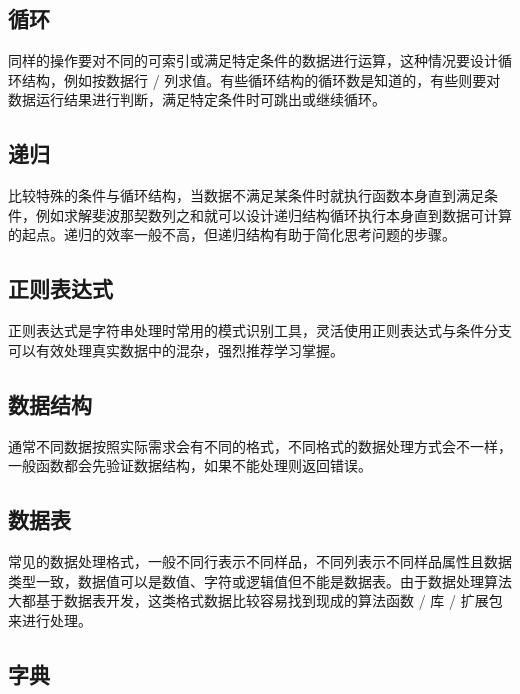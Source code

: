 \documentclass[]{book}
\begin{document}
\hypertarget{ux5faaux73af}{%
\subsection{循环}\label{ux5faaux73af}}

同样的操作要对不同的可索引或满足特定条件的数据进行运算，这种情况要设计循环结构，例如按数据行 / 列求值。有些循环结构的循环数是知道的，有些则要对数据运行结果进行判断，满足特定条件时可跳出或继续循环。

\hypertarget{ux9012ux5f52}{%
\subsection{递归}\label{ux9012ux5f52}}

比较特殊的条件与循环结构，当数据不满足某条件时就执行函数本身直到满足条件，例如求解斐波那契数列之和就可以设计递归结构循环执行本身直到数据可计算的起点。递归的效率一般不高，但递归结构有助于简化思考问题的步骤。

\hypertarget{ux6b63ux5219ux8868ux8fbeux5f0f}{%
\subsection{正则表达式}\label{ux6b63ux5219ux8868ux8fbeux5f0f}}

正则表达式是字符串处理时常用的模式识别工具，灵活使用正则表达式与条件分支可以有效处理真实数据中的混杂，强烈推荐学习掌握。

\hypertarget{ux6570ux636eux7ed3ux6784}{%
\subsection{数据结构}\label{ux6570ux636eux7ed3ux6784}}

通常不同数据按照实际需求会有不同的格式，不同格式的数据处理方式会不一样，一般函数都会先验证数据结构，如果不能处理则返回错误。

\hypertarget{ux6570ux636eux8868}{%
\subsection{数据表}\label{ux6570ux636eux8868}}

常见的数据处理格式，一般不同行表示不同样品，不同列表示不同样品属性且数据类型一致，数据值可以是数值、字符或逻辑值但不能是数据表。由于数据处理算法大都基于数据表开发，这类格式数据比较容易找到现成的算法函数 / 库 / 扩展包来进行处理。

\hypertarget{ux5b57ux5178}{%
\subsection{字典}\label{ux5b57ux5178}}
\end{document}
